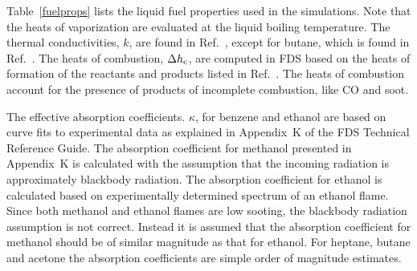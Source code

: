 Table~\ref{fuelprops} lists the liquid fuel properties used in the simulations. Note that the heats of vaporization are evaluated at the liquid boiling temperature. The thermal conductivities, $k$, are found in Ref.~\cite{CRCHandbook}, except for butane, which is found in Ref.~\cite{Webbook:FluidThermo}. The heats of combustion, $\Delta h_{\rm c}$, are computed in FDS based on the heats of formation of the reactants and products listed in Ref.~\cite{NIST_JANAF}. The heats of combustion account for the presence of products of incomplete combustion, like CO and soot.

The effective absorption coefficients. $\kappa$, for benzene and ethanol are based on curve fits to experimental data as explained in Appendix~K of the FDS Technical Reference Guide. The absorption coefficient for methanol presented in Appendix~K is calculated with the assumption that the incoming radiation is approximately blackbody radiation. The absorption coefficient for ethanol is calculated based on experimentally determined spectrum of an ethanol flame. Since both methanol and ethanol flames are low sooting, the blackbody radiation assumption is not correct. Instead it is assumed that the absorption coefficient for methanol should be of similar magnitude as that for ethanol. For heptane, butane and acetone the absorption coefficients are simple order of magnitude estimates.


